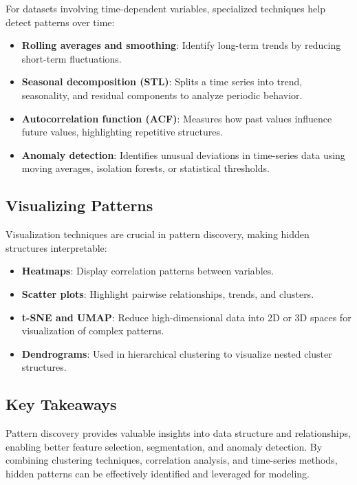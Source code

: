 \documentclass[12pt,openany, draft]{book}
\begin{document}
For datasets involving time-dependent variables, specialized techniques help detect patterns over time:
\begin{itemize}
    \item \textbf{Rolling averages and smoothing}: Identify long-term trends by reducing short-term fluctuations.
    \item \textbf{Seasonal decomposition (STL)}: Splits a time series into trend, seasonality, and residual components to analyze periodic behavior.
    \item \textbf{Autocorrelation function (ACF)}: Measures how past values influence future values, highlighting repetitive structures.
    \item \textbf{Anomaly detection}: Identifies unusual deviations in time-series data using moving averages, isolation forests, or statistical thresholds.
\end{itemize}

\subsection{Visualizing Patterns}

Visualization techniques are crucial in pattern discovery, making hidden structures interpretable:
\begin{itemize}
    \item \textbf{Heatmaps}: Display correlation patterns between variables.
    \item \textbf{Scatter plots}: Highlight pairwise relationships, trends, and clusters.
    \item \textbf{t-SNE and UMAP}: Reduce high-dimensional data into 2D or 3D spaces for visualization of complex patterns.
    \item \textbf{Dendrograms}: Used in hierarchical clustering to visualize nested cluster structures.
\end{itemize}

\subsection{Key Takeaways}

Pattern discovery provides valuable insights into data structure and relationships, enabling better feature selection, segmentation, and anomaly detection. By combining clustering techniques, correlation analysis, and time-series methods, hidden patterns can be effectively identified and leveraged for modeling.
\newline
\end{document}
